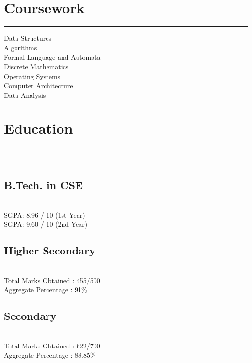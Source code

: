 \documentclass[]{debjitpal-resume}
\begin{document}
\begin{minipage}[t]{0.35\textwidth}
\section{Coursework}
\noindent\rule{5cm}{0.4pt}

Data Structures\\
Algorithms\\
Formal Language and Automata \\
Discrete Mathematics\\
Operating Systems\\
Computer Architecture\\
Data Analysis
\sectionsep
\section{Education} 
\noindent\rule{5cm}{0.4pt}\\
\subsection{B.Tech. in CSE}
 \\
SGPA: 8.96 / 10 (1st Year)\\
SGPA: 9.60 / 10 (2nd Year)\\
\vspace{8pt}
\subsection{Higher Secondary}
\\
Total Marks Obtained : 455/500 \\
Aggregate Percentage : 91\%\\
\vspace{8pt}
\subsection{Secondary}
\\
Total Marks Obtained : 622/700 \\
Aggregate Percentage : 88.85\%
\sectionsep
%
%
\end{minipage} 
\hfill
\end{document}
